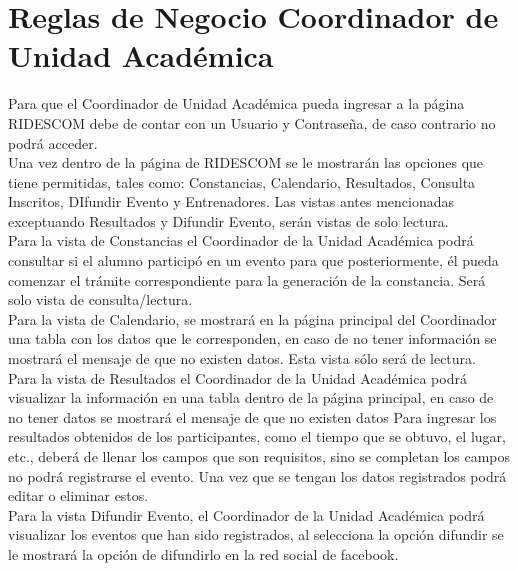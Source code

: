 \section{Reglas de Negocio Coordinador de Unidad Académica}
\noindent Para que el Coordinador de Unidad Académica pueda ingresar a la página RIDESCOM debe de contar con un Usuario y Contraseña, de caso contrario no podrá acceder.\\

\noindent Una vez dentro de la página de RIDESCOM se le mostrarán las opciones que tiene permitidas, tales como: Constancias, Calendario, Resultados, Consulta Inscritos, DIfundir Evento y Entrenadores. Las vistas antes mencionadas exceptuando Resultados y Difundir Evento, serán vistas de solo lectura.\\

\noindent Para la vista de Constancias el Coordinador de la Unidad Académica podrá consultar si el alumno participó en un evento para que posteriormente, él pueda comenzar el trámite correspondiente para la generación de la constancia. Será solo vista de consulta/lectura.\\

\noindent Para la vista de Calendario, se mostrará en la página principal del Coordinador una tabla con los datos que le corresponden, en caso de no tener información se mostrará el mensaje de que no existen datos. Esta vista sólo será de lectura.\\

\noindent Para la vista de Resultados el Coordinador de la Unidad Académica podrá visualizar la información en una tabla dentro de la página principal, en caso de no tener datos se mostrará el mensaje de que no existen datos Para ingresar los resultados obtenidos de los participantes, como el tiempo que se obtuvo, el lugar, etc., deberá de llenar los campos que son requisitos, sino se completan los campos no podrá registrarse el evento. Una vez que se tengan los datos registrados podrá editar o eliminar estos.\\

\noindent Para la vista Difundir Evento, el Coordinador de la Unidad Académica podrá visualizar los eventos que han sido registrados, al selecciona la opción difundir se le mostrará la opción de difundirlo en la red social de facebook.\\

